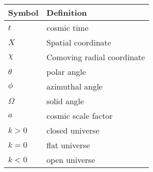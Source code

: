 \begin{tabular}{ll}
 \toprule
  Symbol & Definition \\
 \midrule
 \midrule
  \(t\) & cosmic time \\
  \(X\) & Spatial coordinate \\
  \(\chi\) & Comoving radial coordinate \\
  \(\theta\) & polar angle \\
  \(\phi\) & azimuthal angle \\
  \(\Omega\) & solid angle \\
  \(a\) & cosmic scale factor \\
  \(k>0\) & closed universe \\
  \(k=0\) & flat universe \\
  \(k<0\) & open universe \\
 \bottomrule
\end{tabular}
